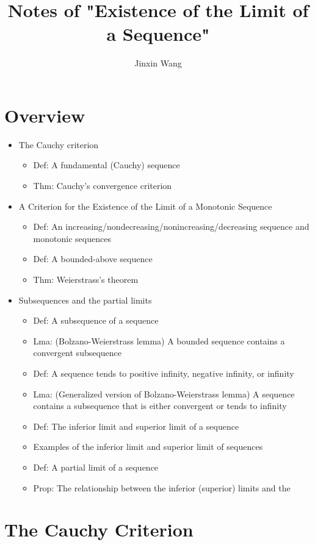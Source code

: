 \documentclass[onecolumn]{ctexart}
\title{Notes of "Existence of the Limit of a Sequence"}
\author{Jinxin Wang}
\date{}
\begin{document}
\maketitle

\section{Overview}
\begin{itemize}
  \item The Cauchy criterion
  \begin{itemize}
    \item Def: A fundamental (Cauchy) sequence
    \item Thm: Cauchy's convergence criterion
  \end{itemize}
  \item A Criterion for the Existence of the Limit of a Monotonic Sequence
  \begin{itemize}
    \item Def: An increasing/nondecreasing/nonincreasing/decreasing sequence and monotonic sequences
    \item Def: A bounded-above sequence
    \item Thm: Weierstrass's theorem
  \end{itemize}
  \item Subsequences and the partial limits
  \begin{itemize}
    \item Def: A subsequence of a sequence
    \item Lma: (Bolzano-Weierstrass lemma) A bounded sequence contains a convergent subsequence
    \item Def: A sequence tends to positive infinity, negative infinity, or infinity
    \item Lma: (Generalized version  of Bolzano-Weierstrass lemma) A sequence contains a subsequence that is either convergent or tends to infinity
    \item Def: The inferior limit and superior limit of a sequence
    \item Examples of the inferior limit and superior limit of sequences
    \item Def: A partial limit of a sequence
    \item Prop: The relationship between the inferior (superior) limits and the 
  \end{itemize}
\end{itemize}

\section{The Cauchy Criterion}
\end{document}
